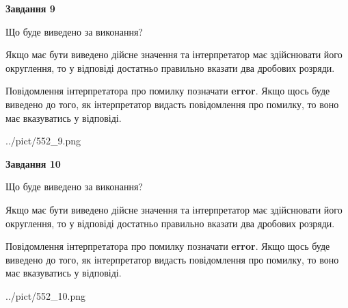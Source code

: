 \documentclass[12pt, ukrainian]{article}
\begin{document}
{\begin {Large}
{\begin {center}\textbf{Завдання 9}\end {center}}\par
Що буде виведено за виконання? \par

Якщо має бути виведено дійсне значення та інтерпретатор має здійснювати його округлення, 
то у відповіді достатньо правильно вказати два дробових розряди.

Повідомлення інтерпретатора про помилку позначати \textbf{error}.
Якщо щось буде виведено до того, як інтерпретатор видасть повідомлення про помилку, 
то воно має вказуватись у відповіді. \par

\begin{center}
	{../pict/552_9.png}
\end{center}
\newpage

{\begin {center}\textbf{Завдання 10}\end {center}}\par
Що буде виведено за виконання? \par

Якщо має бути виведено дійсне значення та інтерпретатор має здійснювати його округлення, 
то у відповіді достатньо правильно вказати два дробових розряди.

Повідомлення інтерпретатора про помилку позначати \textbf{error}.
Якщо щось буде виведено до того, як інтерпретатор видасть повідомлення про помилку, 
то воно має вказуватись у відповіді. \par

\begin{center}
	{../pict/552_10.png}
\end{center}
\newpage

\end {Large}}
\end{document}
